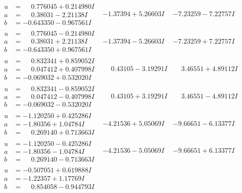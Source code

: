 \documentclass[1p]{elsarticle_modified}
\theoremstyle{definition}
\begin{document}
$$\begin{array}{c|c|c}
\begin{aligned}
u &= \phantom{-}0.776045 + 0.214980 I \\
a &= \phantom{-}0.38031 - 2.21138 I \\
b &= -0.643350 - 0.967561 I\end{aligned}
 & -1.37394 + 5.26603 I & -7.23259 - 7.22757 I \\ \hline\begin{aligned}
u &= \phantom{-}0.776045 - 0.214980 I \\
a &= \phantom{-}0.38031 + 2.21138 I \\
b &= -0.643350 + 0.967561 I\end{aligned}
 & -1.37394 - 5.26603 I & -7.23259 + 7.22757 I \\ \hline\begin{aligned}
u &= \phantom{-}0.832341 + 0.859052 I \\
a &= \phantom{-}0.047412 + 0.407998 I \\
b &= -0.069032 + 0.532020 I\end{aligned}
 & \phantom{-}0.43105 - 3.19291 I & \phantom{-}3.46551 + 4.89112 I \\ \hline\begin{aligned}
u &= \phantom{-}0.832341 - 0.859052 I \\
a &= \phantom{-}0.047412 - 0.407998 I \\
b &= -0.069032 - 0.532020 I\end{aligned}
 & \phantom{-}0.43105 + 3.19291 I & \phantom{-}3.46551 - 4.89112 I \\ \hline\begin{aligned}
u &= -1.120250 + 0.425286 I \\
a &= -1.80356 + 1.04784 I \\
b &= \phantom{-}0.269140 + 0.713663 I\end{aligned}
 & -4.21536 + 5.05069 I & -9.66651 - 6.13377 I \\ \hline\begin{aligned}
u &= -1.120250 - 0.425286 I \\
a &= -1.80356 - 1.04784 I \\
b &= \phantom{-}0.269140 - 0.713663 I\end{aligned}
 & -4.21536 - 5.05069 I & -9.66651 + 6.13377 I \\ \hline\begin{aligned}
u &= -0.507051 + 0.619888 I \\
a &= -1.22357 + 1.17769 I \\
b &= \phantom{-}0.854058 - 0.944793 I\end{aligned}

\end{array}$$
\end{document}
